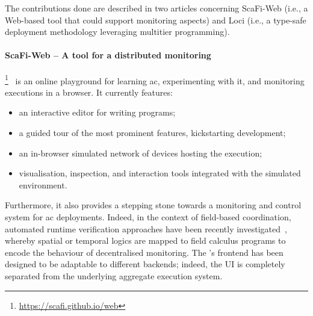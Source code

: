 \documentclass[11pt]{article}
\begin{document}
The contributions done are described in two articles concerning ScaFi-Web (i.e., a Web-based tool that could support monitoring aspects) and \scafi Loci (i.e., a type-safe deployment methodology leveraging multitier programming).
\paragraph{ScaFi-Web -- A tool for a distributed monitoring} \label{scafi-web}
\scafiweb{}\footnote{\url{https://scafi.github.io/web}}~\cite{DBLP:conf/coordination/AguzziCMPV21}
 is an online playground for learning \ac{ac}, experimenting with it, and monitoring executions in a browser.
It currently features:
\begin{itemize}
 \item an interactive editor for writing \scafi{} programs;
 \item a guided tour of the most prominent features, kickstarting development;
 \item an in-browser simulated network of devices hosting the execution;
 \item visualisation, inspection, and interaction tools integrated with the simulated environment.
\end{itemize}
%
Furthermore, it also provides a stepping stone towards a monitoring and control system for \ac{ac} deployments.
Indeed, in the context of field-based coordination, automated runtime verification approaches have been recently investigated~\cite{DBLP:journals/jss/AudritoCDSV21}, whereby spatial or temporal logics are mapped to field calculus programs to encode the behaviour of decentralised monitoring.
%
The \scafiweb{}'s frontend has been designed to be adaptable to different backends; indeed, the UI is completely separated from the underlying aggregate execution system. 
\end{document}
